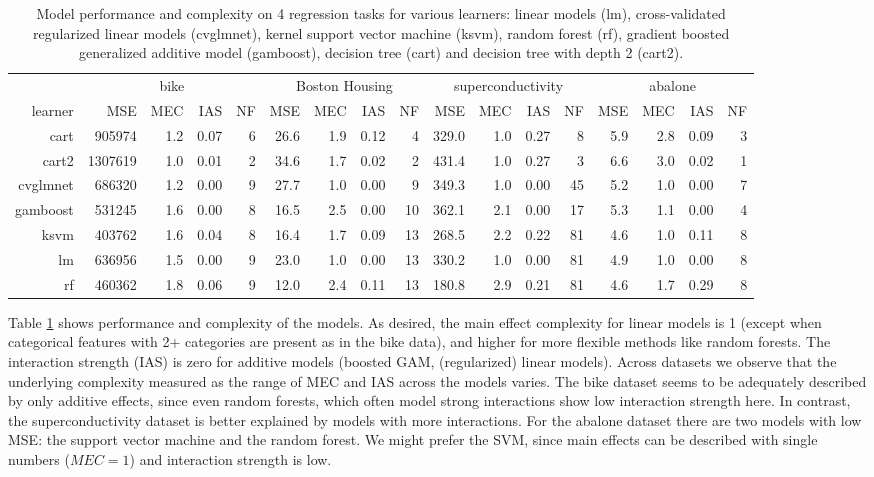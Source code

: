 \documentclass[runningheads]{llncs}\usepackage[]{graphicx}\usepackage[]{color}
\begin{document}
\begin{table}[ht]
\centering
\begingroup\fontsize{8pt}{9pt}\selectfont
\begin{tabular}{r|rrrr|rrrr|rrrr|rrrr|}
  \hline
  & \multicolumn{4}{c|}{bike}& \multicolumn{4}{c|}{Boston Housing}& \multicolumn{4}{c|}{superconductivity}& \multicolumn{4}{c|}{abalone}\\ learner& MSE& MEC& IAS& NF& MSE& MEC& IAS& NF& MSE& MEC& IAS& NF& MSE& MEC& IAS& NF\\ \hline
cart & 905974 & 1.2 & 0.07 & 6 & 26.6 & 1.9 & 0.12 & 4 & 329.0 & 1.0 & 0.27 & 8 & 5.9 & 2.8 & 0.09 & 3 \\ 
  cart2 & 1307619 & 1.0 & 0.01 & 2 & 34.6 & 1.7 & 0.02 & 2 & 431.4 & 1.0 & 0.27 & 3 & 6.6 & 3.0 & 0.02 & 1 \\ 
  cvglmnet & 686320 & 1.2 & 0.00 & 9 & 27.7 & 1.0 & 0.00 & 9 & 349.3 & 1.0 & 0.00 & 45 & 5.2 & 1.0 & 0.00 & 7 \\ 
  gamboost & 531245 & 1.6 & 0.00 & 8 & 16.5 & 2.5 & 0.00 & 10 & 362.1 & 2.1 & 0.00 & 17 & 5.3 & 1.1 & 0.00 & 4 \\ 
  ksvm & 403762 & 1.6 & 0.04 & 8 & 16.4 & 1.7 & 0.09 & 13 & 268.5 & 2.2 & 0.22 & 81 & 4.6 & 1.0 & 0.11 & 8 \\ 
  lm & 636956 & 1.5 & 0.00 & 9 & 23.0 & 1.0 & 0.00 & 13 & 330.2 & 1.0 & 0.00 & 81 & 4.9 & 1.0 & 0.00 & 8 \\ 
  rf & 460362 & 1.8 & 0.06 & 9 & 12.0 & 2.4 & 0.11 & 13 & 180.8 & 2.9 & 0.21 & 81 & 4.6 & 1.7 & 0.29 & 8 \\ 
   \hline
\end{tabular}
\endgroup
\caption{Model performance and complexity on 4 regression tasks for various learners: linear models (lm), cross-validated regularized linear models (cvglmnet), kernel support vector machine (ksvm), random forest (rf), gradient boosted generalized additive model (gamboost), decision tree (cart) and decision tree with depth 2 (cart2).} 
\label{tab:exp}
\end{table}


Table \ref{tab:exp} shows performance and complexity of the models.
As desired, the main effect complexity for linear models is 1 (except when categorical features with 2+ categories are present as in the bike data), and higher for more flexible methods like random forests.
The interaction strength (IAS) is zero for additive models (boosted GAM, (regularized) linear models).
Across datasets we observe that the underlying complexity measured as the range of MEC and IAS across the models varies.
The bike dataset seems to be adequately described by only additive effects, since even random forests, which often model strong interactions show low interaction strength here.
In contrast, the superconductivity dataset is better explained by models with more interactions.
For the abalone dataset there are two models with low MSE: the support vector machine and the random forest.
We might prefer the SVM, since main effects can be described with single numbers ($MEC = 1$) and interaction strength is low.
\end{document}
